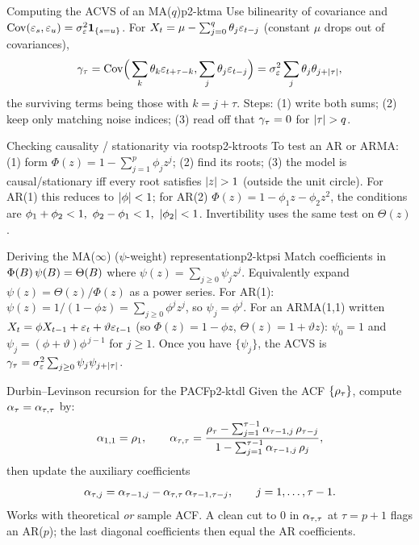 \begin{keytech}{Computing the ACVS of an MA($q$)}{p2-ktma}
Use bilinearity of covariance and
$\operatorname{Cov}(\varepsilon_s,\varepsilon_u)=\sigma_\varepsilon^2\mathbf{1}_{\{s=u\}}$. For
$X_t=\mu-\sum_{j=0}^q\theta_j\varepsilon_{t-j}$ (constant $\mu$ drops out of
covariances),
\[
\gamma_\tau=\operatorname{Cov}\!\Big(\sum_{k}\theta_k\varepsilon_{t+\tau-k},\sum_j\theta_j\varepsilon_{t-j}\Big)
=\sigma_\varepsilon^2\sum_{j}\theta_j\theta_{j+\left\lvert \tau \right\rvert},
\]
the surviving terms being those with $k=j+\tau$. Steps: (1) write both sums; (2)
keep only matching noise indices; (3) read off that $\gamma_\tau=0$ for
$\left\lvert \tau \right\rvert>q$.
\end{keytech}

\begin{keytech}{Checking causality / stationarity via roots}{p2-ktroots}
To test an AR or ARMA: (1) form $\Phi(z)=1-\sum_{j=1}^p\phi_j z^j$; (2) find its
roots; (3) the model is causal/stationary iff every root satisfies $\left\lvert z \right\rvert>1$
(outside the unit circle). For AR(1) this reduces to $\left\lvert \phi \right\rvert<1$; for AR(2)
$\Phi(z)=1-\phi_1 z-\phi_2 z^2$, the conditions are
$\phi_1+\phi_2<1,\ \phi_2-\phi_1<1,\ \abs{\phi_2}<1$. Invertibility uses the same
test on $\Theta(z)$.
\end{keytech}

\begin{keytech}{Deriving the MA($\infty$) ($\psi$-weight) representation}{p2-ktpsi}
Match coefficients in $\Phi(B)\,\psi(B)=\Theta(B)$ where
$\psi(z)=\sum_{j\ge0}\psi_j z^j$. Equivalently expand
$\psi(z)=\Theta(z)/\Phi(z)$ as a power series. For AR(1):
$\psi(z)=1/(1-\phi z)=\sum_{j\ge0}\phi^j z^j$, so $\psi_j=\phi^j$. For an
ARMA(1,1) written $X_t=\phi X_{t-1}+\varepsilon_t+\vartheta\varepsilon_{t-1}$
(so $\Phi(z)=1-\phi z$, $\Theta(z)=1+\vartheta z$):
$\psi_0=1$ and $\psi_j=(\phi+\vartheta)\phi^{\,j-1}$ for $j\ge1$. Once you have
$\{\psi_j\}$, the ACVS is
$\gamma_\tau=\sigma_\varepsilon^2\sum_{j\ge0}\psi_j\psi_{j+\left\lvert \tau \right\rvert}$.
\end{keytech}

\begin{keytech}{Durbin--Levinson recursion for the PACF}{p2-ktdl}
Given the ACF $\{\rho_\tau\}$, compute $\alpha_\tau=\alpha_{\tau,\tau}$ by:
\[
\alpha_{1,1}=\rho_1,\qquad
\alpha_{\tau,\tau}
=\frac{\rho_\tau-\sum_{j=1}^{\tau-1}\alpha_{\tau-1,j}\,\rho_{\tau-j}}
       {1-\sum_{j=1}^{\tau-1}\alpha_{\tau-1,j}\,\rho_{j}},
\]
then update the auxiliary coefficients
\[
\alpha_{\tau,j}=\alpha_{\tau-1,j}-\alpha_{\tau,\tau}\,\alpha_{\tau-1,\tau-j},
\qquad j=1,\dots,\tau-1 .
\]
Works with theoretical \emph{or} sample ACF. A clean cut to $0$ in
$\alpha_{\tau,\tau}$ at $\tau=p+1$ flags an AR($p$); the last diagonal
coefficients then equal the AR coefficients.
\end{keytech}

